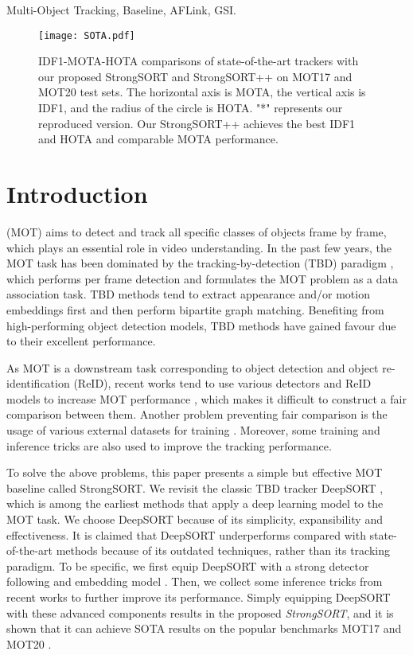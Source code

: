 \documentclass[lettersize,journal]{IEEEtran}
\begin{document}
\begin{IEEEkeywords}
  Multi-Object Tracking, Baseline, AFLink, GSI.
\end{IEEEkeywords}

\begin{figure*}[t]
  \centering
  \texttt{[image: SOTA.pdf]}
  \caption{
    IDF1-MOTA-HOTA comparisons of state-of-the-art trackers with our proposed StrongSORT and StrongSORT++ on MOT17 and MOT20 test sets.
    The horizontal axis is MOTA, the vertical axis is IDF1, and the radius of the circle is HOTA.
    "*" represents our reproduced version.
    Our StrongSORT++ achieves the best IDF1 and HOTA and comparable MOTA performance.
  }
  \label{figure_SOTA}
\end{figure*}

\section{Introduction}

 (MOT) aims to detect and track all specific classes of objects frame by frame,
which plays an essential role in video understanding.
In the past few years, the MOT task has been dominated by the tracking-by-detection (TBD) paradigm \cite{yu2016poi,bewley2016simple,wojke2017simple,bochinski2017high,naiel2017online},
which performs per frame detection and formulates the MOT problem as a data association task.
TBD methods tend to extract appearance and/or motion embeddings first and then perform bipartite graph matching.
Benefiting from high-performing object detection models, TBD methods have gained favour due to their excellent performance.

As MOT is a downstream task corresponding to object detection and object re-identification (ReID),
recent works tend to use various detectors and ReID models to increase MOT performance \cite{ge2021yolox, ren2015faster},
which makes it difficult to construct a fair comparison between them.
Another problem preventing fair comparison is the usage of various external datasets for training \cite{zhang2021fairmot,zhang2022bytetrack}.
Moreover, some training and inference tricks are also used to improve the tracking performance.

To solve the above problems, this paper presents a simple but effective MOT baseline called StrongSORT.
We revisit the classic TBD tracker DeepSORT \cite{wojke2017simple}, 
which is among the earliest methods that apply a deep learning model to the MOT task.
We choose DeepSORT because of its simplicity, expansibility and effectiveness.
It is claimed that DeepSORT underperforms compared with state-of-the-art methods because of its outdated techniques, rather than its tracking paradigm.
To be specific, we first equip DeepSORT with a strong detector \cite{ge2021yolox} following \cite{zhang2022bytetrack} and embedding model \cite{luo2019strong}.
Then, we collect some inference tricks from recent works to further improve its performance.
Simply equipping DeepSORT with these advanced components results in the proposed \emph{StrongSORT}, 
and it is shown that it can achieve SOTA results on the popular benchmarks MOT17 \cite{milan2016mot16} and MOT20 \cite{dendorfer2020mot20}.
\end{document}
